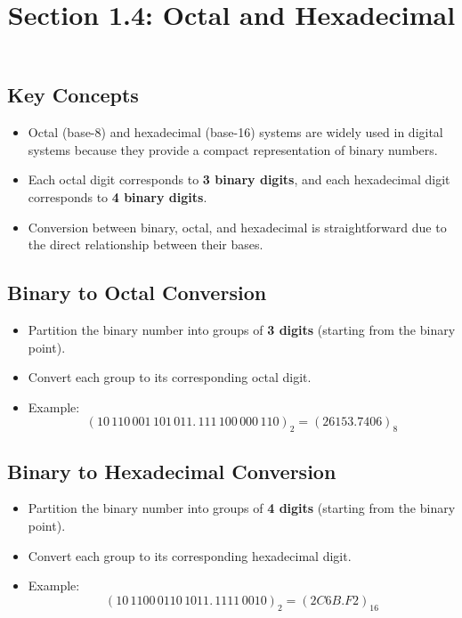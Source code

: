 \documentclass{article}
\title{Section 1.4: Octal and Hexadecimal}
\date{}
\begin{document}
	
	\maketitle

	\subsection*{Key Concepts}
	\begin{itemize}
		\item Octal (base-8) and hexadecimal (base-16) systems are widely used in digital systems because they provide a compact representation of binary numbers.
		\item Each octal digit corresponds to \textbf{3 binary digits}, and each hexadecimal digit corresponds to \textbf{4 binary digits}.
		\item Conversion between binary, octal, and hexadecimal is straightforward due to the direct relationship between their bases.
	\end{itemize}
	
	\subsection*{Binary to Octal Conversion}
	\begin{itemize}
		\item Partition the binary number into groups of \textbf{3 digits} (starting from the binary point).
		\item Convert each group to its corresponding octal digit.
		\item Example:
		\[
		(10\,110\,001\,101\,011.\,111\,100\,000\,110)_2 = (26153.7406)_8
		\]
	\end{itemize}
	
	\subsection*{Binary to Hexadecimal Conversion}
	\begin{itemize}
		\item Partition the binary number into groups of \textbf{4 digits} (starting from the binary point).
		\item Convert each group to its corresponding hexadecimal digit.
		\item Example:
		\[
		(10\,1100\,0110\,1011.\,1111\,0010)_2 = (2C6B.F2)_{16}
		\]
	\end{itemize}
	
\end{document}
